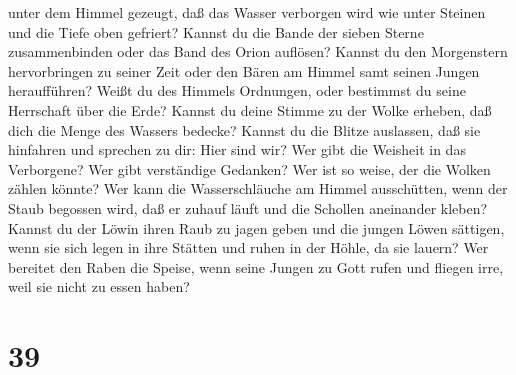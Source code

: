unter dem Himmel gezeugt,  daß das Wasser verborgen wird
wie unter Steinen und die Tiefe oben gefriert?  Kannst du
die Bande der sieben Sterne zusammenbinden oder das Band des Orion
auflösen?  Kannst du den Morgenstern hervorbringen zu
seiner Zeit oder den Bären am Himmel samt seinen Jungen heraufführen?
 Weißt du des Himmels Ordnungen, oder bestimmst du seine
Herrschaft über die Erde?  Kannst du deine Stimme zu der
Wolke erheben, daß dich die Menge des Wassers bedecke? 
Kannst du die Blitze auslassen, daß sie hinfahren und sprechen zu dir:
Hier sind wir?  Wer gibt die Weisheit in das Verborgene?
Wer gibt verständige Gedanken?  Wer ist so weise, der die
Wolken zählen könnte? Wer kann die Wasserschläuche am Himmel
ausschütten,  wenn der Staub begossen wird, daß er zuhauf
läuft und die Schollen aneinander kleben?  Kannst du der
Löwin ihren Raub zu jagen geben und die jungen Löwen sättigen,
 wenn sie sich legen in ihre Stätten und ruhen in der
Höhle, da sie lauern?  Wer bereitet den Raben die Speise,
wenn seine Jungen zu Gott rufen und fliegen irre, weil sie nicht zu
essen haben?

\hypertarget{section-38}{%
\section{39}\label{section-38}}

